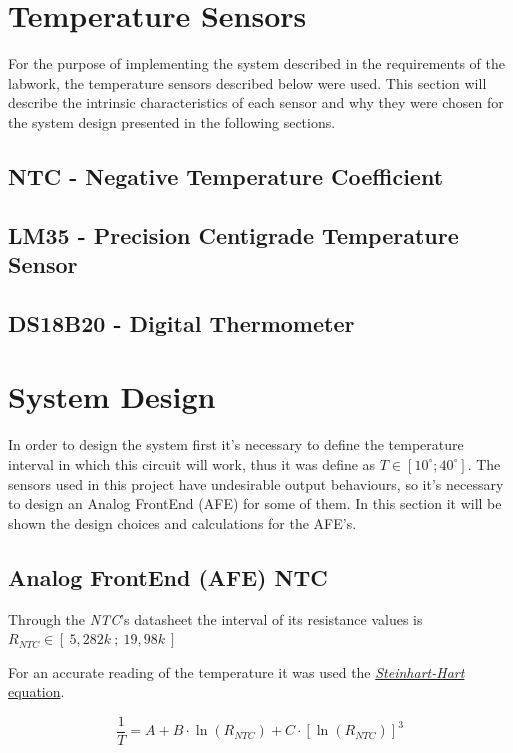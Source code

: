 \documentclass[12pt]{article}
\begin{document}
\section{Temperature Sensors}
For the purpose of implementing the system described in the requirements of the labwork,
the temperature sensors described below were used. This section will describe the intrinsic
characteristics of each sensor and why they were chosen for the system design presented in the
following sections.
\subsection{NTC - Negative Temperature Coefficient}

\subsection{LM35 - Precision Centigrade Temperature Sensor}

\subsection{DS18B20 - Digital Thermometer}

\section{System Design}
In order to design the system first it's necessary to define the temperature interval in which this circuit will work, thus it was define as $T \in [ 10^{\circ}; 40^{\circ} ]$. 
The sensors used in this project have undesirable output behaviours, so it's necessary to design an Analog FrontEnd (AFE) for some of them. In this section it will be shown the design choices and calculations for the AFE's.
\subsection{Analog FrontEnd (AFE) NTC}
\label{ AFENTC }

    Through the \textit{NTC}'s datasheet the interval of its resistance values is $R_{NTC} \in [~5,282k~;~19,98k~]$

    For an accurate reading of the temperature it was used the 
    \hyperref[eq:1]{ \textit{Steinhart-Hart} equation}.

    \begin{equation} \label{eq:1}
    \frac{1}{T} = A + B\cdot \ln(R_{NTC}) + C\cdot [\ln(R_{NTC})]^3
    \end{equation}
\end{document}
